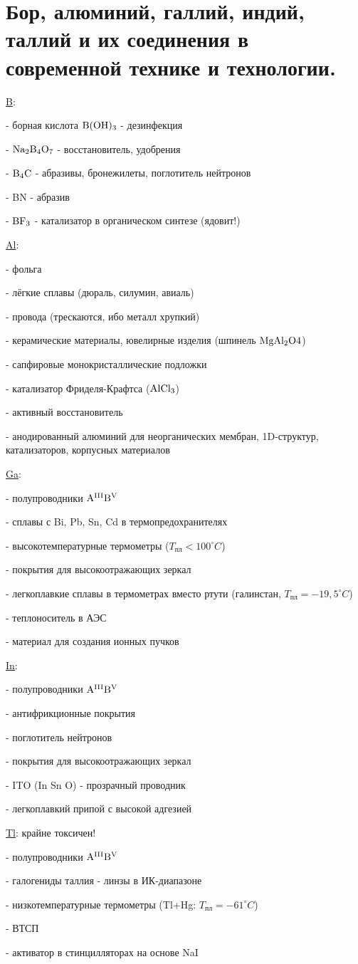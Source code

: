 \section{Бор, алюминий, галлий, индий, таллий и их соединения в современной
технике и технологии.}
\underline{B}:
\par - борная кислота $\rm B(OH)_3$ - дезинфекция
\par - $\rm Na_2B_4O_7$ - восстановитель, удобрения
\par - $\rm B_4C$  - абразивы, бронежилеты, поглотитель нейтронов
\par - BN - абразив
\par - $\rm BF_3$ - катализатор в органическом синтезе (ядовит!)
\par \underline{Al}:
\par - фольга
\par - лёгкие сплавы (дюраль, силумин, авиаль)
\par - провода (трескаются, ибо металл хрупкий)
\par - керамические материалы, ювелирные изделия (шпинель $\rm MgAl_2O4$)
\par - сапфировые монокристаллические подложки
\par - катализатор Фриделя-Крафтса ($\rm AlCl_3$)
\par - активный восстановитель
\par - анодированный алюминий для неорганических мембран, 1D-структур, катализаторов, корпусных материалов
\par \underline{Ga}:
\par - полупроводники $\rm A^{III}B^{V}$
\par - сплавы с Bi, Pb, Sn, Cd в термопредохранителях
\par - высокотемпературные термометры ($T_\text{пл}<100^\circ C$)
\par - покрытия для высокоотражающих зеркал
\par - легкоплавкие сплавы в термометрах вместо ртути (галинстан, $T_\text{пл}=-19,5^\circ C$)
\par - теплоноситель в АЭС
\par - материал для создания ионных пучков
\par \underline{In}:
\par - полупроводники $\rm A^{III}B^{V}$
\par - антифрикционные покрытия
\par - поглотитель нейтронов
\par - покрытия для высокоотражающих зеркал
\par - ITO (In Sn O) - прозрачный проводник
\par - легкоплавкий припой с высокой адгезией
\par \underline{Tl}: крайне токсичен!
\par - полупроводники $\rm A^{III}B^{V}$
\par - галогениды таллия - линзы в ИК-диапазоне
\par - низкотемпературные термометры (Tl+Hg: $T_\text{пл}=-61^\circ C$)
\par - ВТСП
\par - активатор в стинцилляторах на основе NaI
